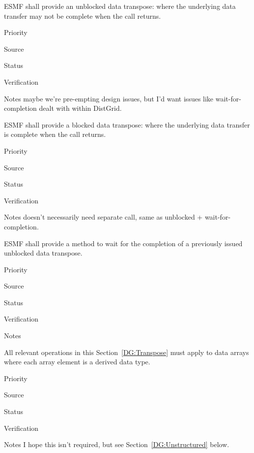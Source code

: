 ESMF shall provide an unblocked data transpose: where the underlying
data transfer may not be complete when the call returns.

\begin{reqlist}
\item[Priority]
\item[Source]
\item[Status]
\item[Verification]
\item[Notes] maybe we're pre-empting design issues, but I'd want
  issues like wait-for-completion dealt with within DistGrid.
\end{reqlist}


ESMF shall provide a blocked data transpose: where the underlying
data transfer is complete when the call returns.

\begin{reqlist}
\item[Priority]
\item[Source]
\item[Status]
\item[Verification]
\item[Notes] doesn't necessarily need separate call, same as unblocked
  + wait-for-completion.
\end{reqlist}


ESMF shall provide a method to wait for the completion of a previously
issued unblocked data transpose.

\begin{reqlist}
\item[Priority]
\item[Source]
\item[Status]
\item[Verification]
\item[Notes]
\end{reqlist}


All relevant operations in this Section~\ref{DG:Transpose} must apply to
data arrays where each array element is a derived data type.

\begin{reqlist}
\item[Priority]
\item[Source]
\item[Status]
\item[Verification]
\item[Notes] I hope this isn't required, but see
  Section~\ref{DG:Unstructured} below.
\end{reqlist}

